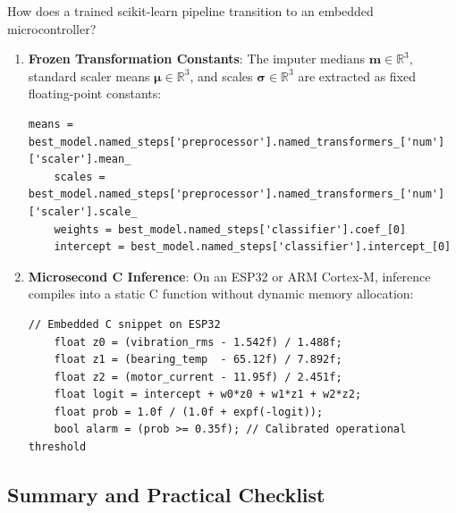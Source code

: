 \begin{iotbox}
How does a trained scikit-learn pipeline transition to an embedded microcontroller?
\begin{enumerate}
    \item \textbf{Frozen Transformation Constants}: The imputer medians $\mathbf{m} \in \mathbb{R}^3$, standard scaler means $\boldsymbol{\mu} \in \mathbb{R}^3$, and scales $\boldsymbol{\sigma} \in \mathbb{R}^3$ are extracted as fixed floating-point constants:
    \begin{lstlisting}[style=pythonstyle]
    means = best_model.named_steps['preprocessor'].named_transformers_['num']['scaler'].mean_
    scales = best_model.named_steps['preprocessor'].named_transformers_['num']['scaler'].scale_
    weights = best_model.named_steps['classifier'].coef_[0]
    intercept = best_model.named_steps['classifier'].intercept_[0]
    \end{lstlisting}
    \item \textbf{Microsecond C Inference}: On an ESP32 or ARM Cortex-M, inference compiles into a static C function without dynamic memory allocation:
    \begin{lstlisting}[style=pythonstyle]
    // Embedded C snippet on ESP32
    float z0 = (vibration_rms - 1.542f) / 1.488f;
    float z1 = (bearing_temp  - 65.12f) / 7.892f;
    float z2 = (motor_current - 11.95f) / 2.451f;
    float logit = intercept + w0*z0 + w1*z1 + w2*z2;
    float prob = 1.0f / (1.0f + expf(-logit));
    bool alarm = (prob >= 0.35f); // Calibrated operational threshold
    \end{lstlisting}
\end{enumerate}
\end{iotbox}

\subsection{Summary and Practical Checklist}\label{subsec:model_quality_summary}

